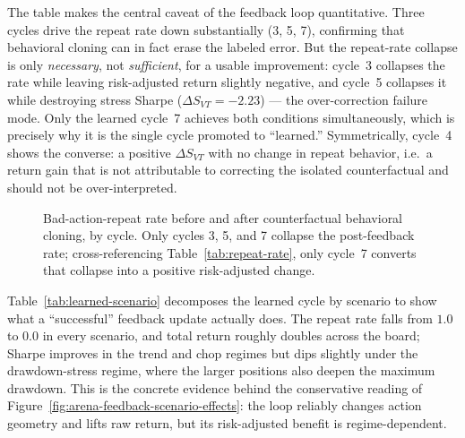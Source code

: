 \documentclass[10pt]{article}
\begin{document}
The table makes the central caveat of the feedback loop quantitative. Three cycles drive the
repeat rate down substantially (3, 5, 7), confirming that behavioral cloning can in fact erase
the labeled error. But the repeat-rate collapse is only \emph{necessary}, not
\emph{sufficient}, for a usable improvement: cycle~3 collapses the rate while leaving
risk-adjusted return slightly negative, and cycle~5 collapses it while destroying stress Sharpe
(\(\Delta S_{VT}=-2.23\)) --- the over-correction failure mode. Only the learned cycle~7
achieves both conditions simultaneously, which is precisely why it is the single cycle promoted
to ``learned.'' Symmetrically, cycle~4 shows the converse: a positive \(\Delta S_{VT}\) with no
change in repeat behavior, i.e.\ a return gain that is not attributable to correcting the
isolated counterfactual and should not be over-interpreted.

\begin{figure}[htbp]
	\centering
	\caption{Bad-action-repeat rate before and after counterfactual behavioral cloning, by
		cycle. Only cycles 3, 5, and 7 collapse the post-feedback rate; cross-referencing
		Table~\ref{tab:repeat-rate}, only cycle~7 converts that collapse into a positive
		risk-adjusted change.}
	\label{fig:repeat-rate}
\end{figure}

Table~\ref{tab:learned-scenario} decomposes the learned cycle by scenario to show what a
``successful'' feedback update actually does. The repeat rate falls from \(1.0\) to \(0.0\) in
every scenario, and total return roughly doubles across the board; Sharpe improves in the trend
and chop regimes but dips slightly under the drawdown-stress regime, where the larger positions
also deepen the maximum drawdown. This is the concrete evidence behind the conservative reading
of Figure~\ref{fig:arena-feedback-scenario-effects}: the loop reliably changes action geometry
and lifts raw return, but its risk-adjusted benefit is regime-dependent.
\end{document}
